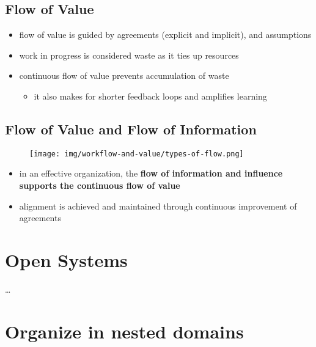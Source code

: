 \subsection{Flow of Value}
\label{flowofvalue}

\begin{itemize}
\item flow of value is guided by agreements (explicit and implicit), and assumptions

\item work in progress is considered waste as it ties up resources

\item continuous flow of value prevents accumulation of waste

\begin{itemize}
\item it also makes for shorter feedback loops and amplifies learning

\end{itemize}

\end{itemize}

\subsection{Flow of Value and Flow of Information}
\label{flowofvalueandflowofinformation}

\begin{figure}[htbp]
\centering
\texttt{[image: img/workflow-and-value/types-of-flow.png]}
\end{figure}

\begin{itemize}
\item in an effective organization, the \textbf{flow of information and influence supports the continuous flow of value}

\item alignment is achieved and maintained through continuous improvement of agreements

\end{itemize}

\section{Open Systems}
\label{opensystems}

{\ldots}

\section{Organize in nested domains}
\label{organizeinnesteddomains}

